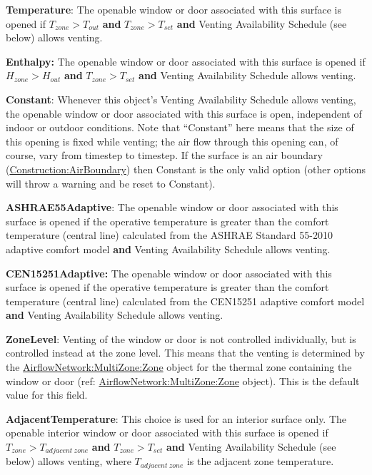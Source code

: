 \textbf{Temperature}: The openable window or door associated with this surface
is opened if $T_{zone} > T_{out}$ \textbf{and} $T_{zone} > T_{set}$ \textbf{and}
Venting Availability Schedule (see below) allows venting.

\textbf{Enthalpy:} The openable window or door associated with this surface is
opened if $H_{zone} > H_{out}$ \textbf{and} $T_{zone} > T_{set}$ \textbf{and}
Venting Availability Schedule allows venting.

\textbf{Constant}: Whenever this object's Venting Availability Schedule allows venting, the openable window or door associated with this surface is open, independent of indoor or outdoor conditions. Note that ``Constant'' here means that the size of this opening is fixed while venting; the air flow through this opening can, of course, vary from timestep to timestep. If the surface is an air boundary (\hyperref[constructionairboundary]{Construction:AirBoundary}) then Constant is the only valid option (other options will throw a warning and be reset to Constant).

\textbf{ASHRAE55Adaptive}: The openable window or door associated with this surface is opened if the operative temperature is greater than the comfort temperature (central line) calculated from the ASHRAE Standard 55-2010 adaptive comfort model \textbf{and} Venting Availability Schedule allows venting.

\textbf{CEN15251Adaptive:} The openable window or door associated with this surface is opened if the operative temperature is greater than the comfort temperature (central line) calculated from the CEN15251 adaptive comfort model \textbf{and} Venting Availability Schedule allows venting.

\textbf{ZoneLevel}: Venting of the window or door is not controlled individually, but is controlled instead at the zone level. This means that the venting is determined by the \hyperref[airflownetworkmultizonezone]{AirflowNetwork:MultiZone:Zone} object for the thermal zone containing the window or door (ref: \hyperref[airflownetworkmultizonezone]{AirflowNetwork:MultiZone:Zone} object). This is the default value for this field.

\textbf{AdjacentTemperature}: This choice is used for an interior surface only.
The openable interior window or door associated with this surface is opened if
$T_{zone} > T_{adjacent\ zone}$ \textbf{and} $T_{zone} > T_{set}$ \textbf{and}
Venting Availability Schedule (see below) allows venting, where $T_{adjacent\ zone}$
is the adjacent zone temperature.

